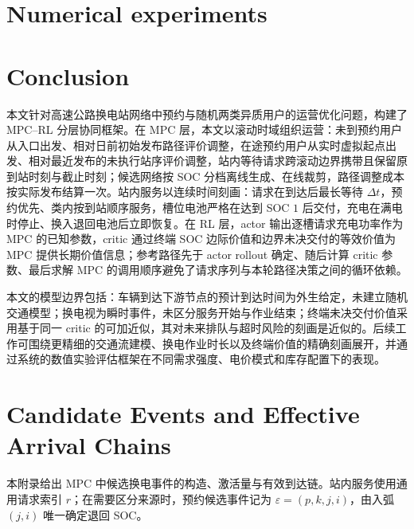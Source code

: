 \documentclass[12pt,a4paper,UTF8]{ctexart}
\begin{document}
\section{Numerical experiments}



\section{Conclusion}

本文针对高速公路换电站网络中预约与随机两类异质用户的运营优化问题，构建了 MPC--RL 分层协同框架。在 MPC 层，本文以滚动时域组织运营：未到预约用户从入口出发、相对日前初始发布路径评价调整，在途预约用户从实时虚拟起点出发、相对最近发布的未执行站序评价调整，站内等待请求跨滚动边界携带且保留原到站时刻与截止时刻；候选网络按 SOC 分档离线生成、在线裁剪，路径调整成本按实际发布结算一次。站内服务以连续时间刻画：请求在到达后最长等待 $\Delta t$，预约优先、类内按到站顺序服务，槽位电池严格在达到 SOC $1$ 后交付，充电在满电时停止、换入退回电池后立即恢复。在 RL 层，actor 输出逐槽请求充电功率作为 MPC 的已知参数，critic 通过终端 SOC 边际价值和边界未决交付的等效价值为 MPC 提供长期价值信息；参考路径先于 actor rollout 确定、随后计算 critic 参数、最后求解 MPC 的调用顺序避免了请求序列与本轮路径决策之间的循环依赖。

本文的模型边界包括：车辆到达下游节点的预计到达时间为外生给定，未建立随机交通模型；换电视为瞬时事件，未区分服务开始与作业结束；终端未决交付价值采用基于同一 critic 的可加近似，其对未来排队与超时风险的刻画是近似的。后续工作可围绕更精细的交通流建模、换电作业时长以及终端价值的精确刻画展开，并通过系统的数值实验评估框架在不同需求强度、电价模式和库存配置下的表现。


\appendix

\section{Candidate Events and Effective Arrival Chains}
\label{app:events}

本附录给出 MPC 中候选换电事件的构造、激活量与有效到达链。站内服务使用通用请求索引 $r$；在需要区分来源时，预约候选事件记为 $\varepsilon=(p,k,j,i)$，由入弧 $(j,i)$ 唯一确定退回 SOC。
\end{document}

